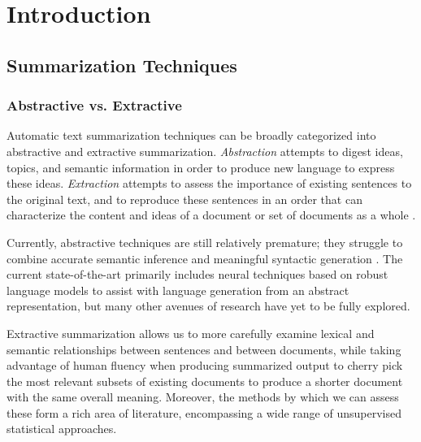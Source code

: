 \documentclass[../writeup.tex]{subfiles}
\begin{document}
\chapter{Introduction}\label{chapter:intro}



\section{Summarization Techniques}\label{intro:sec:extract-sum}
\subsection{Abstractive vs. Extractive}\label{intro:sec:abstractve-vs-extractive}
Automatic text summarization techniques can be broadly categorized into abstractive and
extractive summarization. \textit{Abstraction} attempts to digest ideas, topics, and semantic information
in order to produce new language to express these ideas. \textit{Extraction} attempts to
assess the importance of existing sentences to the original text, and to reproduce these sentences in an order
that can characterize the content and ideas of a document or set of documents as a
whole \autocite*[]{text-summarization-techniques}.

Currently, abstractive techniques are still relatively premature; they struggle to combine
accurate semantic inference and meaningful syntactic generation \autocite*[]{text-summarization-techniques}.
The current state-of-the-art primarily includes neural techniques based on robust
language models to assist with language generation from an abstract representation,
but many other avenues of research have yet to be fully explored.

Extractive summarization allows us to more carefully examine lexical and semantic relationships between sentences and
between documents, while taking advantage of human fluency when producing summarized output to
cherry pick the most relevant subsets of existing documents to produce a shorter document
with the same overall meaning. Moreover, the methods by which we can
assess these  form a rich area of literature, encompassing
a wide range of unsupervised statistical approaches.
\end{document}
